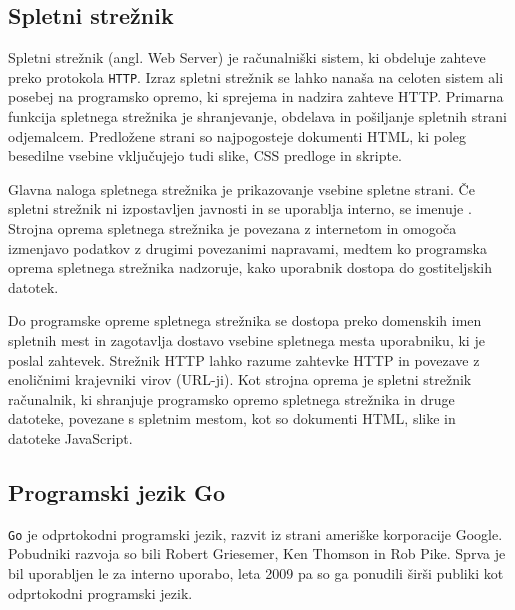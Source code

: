 \documentclass[a4paper, 12pt]{book}
\begin{document}
\subsection{Spletni strežnik}

Spletni strežnik (angl. Web Server) je računalniški sistem, ki obdeluje zahteve preko protokola \verb=HTTP=. Izraz spletni strežnik se lahko nanaša na celoten sistem ali posebej na programsko opremo, ki sprejema in nadzira zahteve HTTP. Primarna funkcija spletnega strežnika je shranjevanje, obdelava in pošiljanje spletnih strani odjemalcem. Predložene strani so najpogosteje dokumenti HTML, ki poleg besedilne vsebine vključujejo tudi slike, CSS predloge in skripte. 

Glavna naloga spletnega strežnika je prikazovanje vsebine spletne strani. Če spletni strežnik ni izpostavljen javnosti in se uporablja interno, se imenuje . Strojna oprema spletnega strežnika je povezana z internetom in omogoča izmenjavo podatkov z drugimi povezanimi napravami, medtem ko programska oprema spletnega strežnika nadzoruje, kako uporabnik dostopa do gostiteljskih datotek.

Do programske opreme spletnega strežnika se dostopa preko domenskih imen spletnih mest in zagotavlja dostavo vsebine spletnega mesta uporabniku, ki je poslal zahtevek. Strežnik HTTP lahko razume zahtevke HTTP in povezave z enoličnimi krajevniki  virov (URL-ji). Kot strojna oprema je spletni strežnik računalnik, ki shranjuje programsko opremo spletnega strežnika in druge datoteke, povezane s spletnim mestom, kot so dokumenti HTML, slike in datoteke JavaScript.



\subsection{Programski jezik Go}

\verb=Go= je odprtokodni programski jezik, razvit iz strani ameriške korporacije Google. Pobudniki razvoja so bili Robert Griesemer, Ken Thomson in Rob Pike. Sprva je bil uporabljen le za interno uporabo, leta 2009 pa so ga ponudili širši publiki kot odprtokodni programski jezik. 
 
\end{document}
